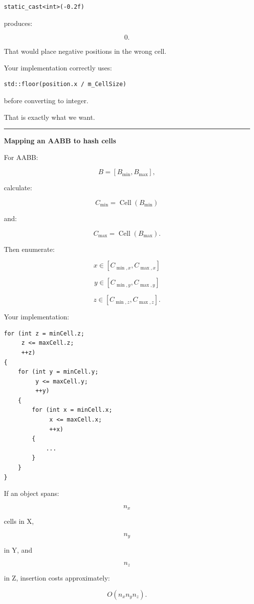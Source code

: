 \begin{verbatim}
static_cast<int>(-0.2f)
\end{verbatim}

produces:

\[
0.
\]

That would place negative positions in the wrong cell.

Your implementation correctly uses:

\begin{verbatim}
std::floor(position.x / m_CellSize)
\end{verbatim}

before converting to integer.

That is exactly what we want.

\begin{center}\rule{0.5\linewidth}{0.5pt}\end{center}

\textbf{Mapping an AABB to hash cells}

For AABB:

\[
B=[B_{\min},B_{\max}],
\]

calculate:

\[
C_{\min}
=
\operatorname{Cell}(B_{\min})
\]

and:

\[
C_{\max}
=
\operatorname{Cell}(B_{\max}).
\]

Then enumerate:

\[
x\in[C_{\min,x},C_{\max,x}]
\]

\[
y\in[C_{\min,y},C_{\max,y}]
\]

\[
z\in[C_{\min,z},C_{\max,z}].
\]

Your implementation:

\begin{verbatim}
for (int z = minCell.z;
     z <= maxCell.z;
     ++z)
{
    for (int y = minCell.y;
         y <= maxCell.y;
         ++y)
    {
        for (int x = minCell.x;
             x <= maxCell.x;
             ++x)
        {
            ...
        }
    }
}
\end{verbatim}

If an object spans:

\[
n_x
\]

cells in X,

\[
n_y
\]

in Y, and

\[
n_z
\]

in Z, insertion costs approximately:

\[
\boxed{
O(n_xn_yn_z).
}
\]

